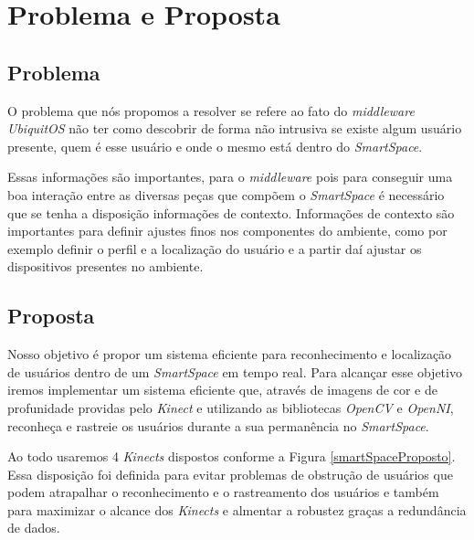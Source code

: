 \chapter{Problema e Proposta}


\section{Problema}
	O problema que nós propomos a resolver se refere ao fato do \textit{middleware} \textit{UbiquitOS} não ter como descobrir de forma não intrusiva se existe algum usuário presente, quem é esse usuário e onde o mesmo está dentro do \textit{SmartSpace}.

	Essas informações são importantes, para o \textit{middleware} pois para conseguir uma boa interação entre as diversas peças que compõem o \textit{SmartSpace} é necessário que se tenha a disposição informações de contexto. Informações de contexto são importantes para definir ajustes finos nos componentes do ambiente, como por exemplo definir o perfil e a localização do usuário e a partir daí ajustar os dispositivos presentes no ambiente.

\section{Proposta}

	Nosso objetivo é propor um sistema eficiente para reconhecimento e localização de usuários dentro de um \textit{SmartSpace} em tempo real. Para alcançar esse objetivo iremos implementar um sistema eficiente que, através de imagens de cor e de profunidade providas pelo \textit{Kinect} e utilizando as bibliotecas \textit{OpenCV} e \textit{OpenNI}, reconheça e rastreie os usuários durante a sua permanência no \textit{SmartSpace}.


	Ao todo usaremos 4 \textit{Kinects} dispostos conforme a Figura \ref{smartSpaceProposto}. Essa disposição foi definida para evitar problemas de obstrução de usuários que podem atrapalhar o reconhecimento e o rastreamento dos usuários e também para maximizar o alcance dos \textit{Kinects} e almentar a robustez graças a redundância de dados.


